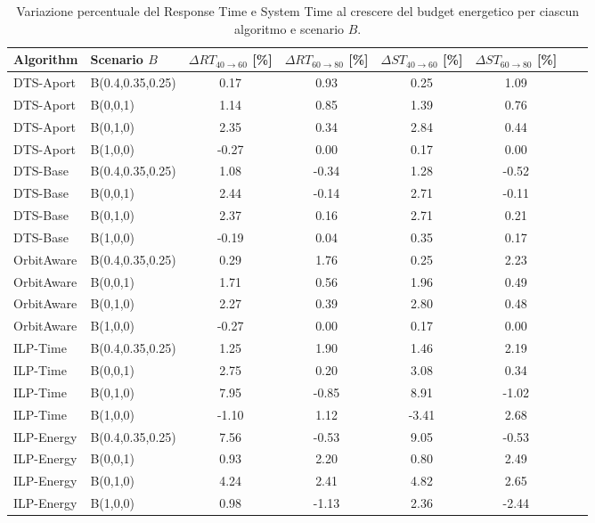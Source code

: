 \documentclass[12pt]{article}
\begin{document}
\begin{table}[h]
\centering
\small
\setlength{\tabcolsep}{0.0000001pt}
\begin{tabularx}{\textwidth}{lXcccccc}
\hline
Algorithm & Scenario $B$ 
& $\Delta RT_{40 \rightarrow 60}$ [\%] 
& $\Delta RT_{60 \rightarrow 80}$ [\%]
& $\Delta ST_{40 \rightarrow 60}$ [\%]
& $\Delta ST_{60 \rightarrow 80}$ [\%] \\
\hline
DTS-Aport      & B(0.4,0.35,0.25) & 0.17 & 0.93 & 0.25 & 1.09 \\
DTS-Aport      & B(0,0,1)         & 1.14 & 0.85 & 1.39 & 0.76 \\
DTS-Aport      & B(0,1,0)         & 2.35 & 0.34 & 2.84 & 0.44 \\
DTS-Aport      & B(1,0,0)         & -0.27 & 0.00 & 0.17 & 0.00 \\
\hline
DTS-Base       & B(0.4,0.35,0.25) & 1.08 & -0.34 & 1.28 & -0.52 \\
DTS-Base       & B(0,0,1)         & 2.44 & -0.14 & 2.71 & -0.11 \\
DTS-Base       & B(0,1,0)         & 2.37 & 0.16 & 2.71 & 0.21 \\
DTS-Base       & B(1,0,0)         & -0.19 & 0.04 & 0.35 & 0.17 \\
\hline
OrbitAware     & B(0.4,0.35,0.25) & 0.29 & 1.76 & 0.25 & 2.23 \\
OrbitAware     & B(0,0,1)         & 1.71 & 0.56 & 1.96 & 0.49 \\
OrbitAware     & B(0,1,0)         & 2.27 & 0.39 & 2.80 & 0.48 \\
OrbitAware     & B(1,0,0)         & -0.27 & 0.00 & 0.17 & 0.00 \\
\hline
ILP-Time       & B(0.4,0.35,0.25) & 1.25 & 1.90 & 1.46 & 2.19 \\
ILP-Time       & B(0,0,1)         & 2.75 & 0.20 & 3.08 & 0.34 \\
ILP-Time       & B(0,1,0)         & 7.95 & -0.85 & 8.91 & -1.02 \\
ILP-Time       & B(1,0,0)         & -1.10 & 1.12 & -3.41 & 2.68 \\
\hline
ILP-Energy     & B(0.4,0.35,0.25) & 7.56 & -0.53 & 9.05 & -0.53 \\
ILP-Energy     & B(0,0,1)         & 0.93 & 2.20 & 0.80 & 2.49 \\
ILP-Energy     & B(0,1,0)         & 4.24 & 2.41 & 4.82 & 2.65 \\
ILP-Energy     & B(1,0,0)         & 0.98 & -1.13 & 2.36 & -2.44 \\
\hline
\end{tabularx}
\caption{Variazione percentuale del Response Time e System Time al crescere del budget energetico per ciascun algoritmo e scenario $B$.}
\label{tab:rt_st_variation_time_all}
\end{table}
\FloatBarrier
\end{document}

